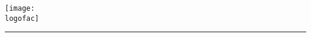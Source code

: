 


\begin{titlepage}
    \begin{center}
        \texttt{[image: \\logofac]}\\
         \vspace{-0.5cm}
        \textbf{\huge{\universidad}}
        
        \Large{\carrera}
        
         \vspace{-0.3cm}
        \LARGE{\materia}
        
        \vspace{-0.8cm}
        \rule{10cm}{0.01cm}\\
        \LARGE{\textbf{\unidad}}
        
        \vspace{-0.3cm}
        
        \Large{\titulo}
        

\end{center}
\end{titlepage}
